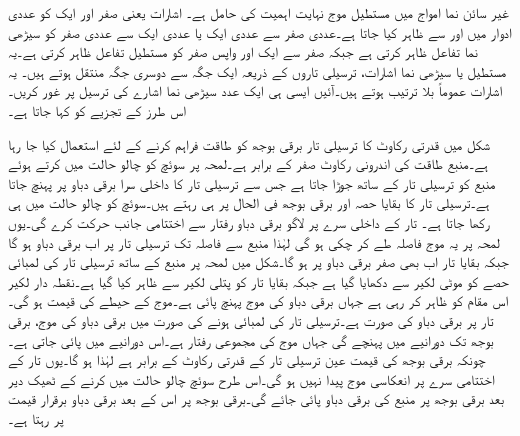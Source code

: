 غیر سائن نما امواج میں مستطیل موج نہایت اہمیت کی حامل ہے۔ اشارات یعنی صفر اور  ایک  کو عددی ادوار  میں  اور  سے ظاہر کیا جاتا ہے۔عددی صفر سے عددی ایک یا عددی ایک سے عددی صفر کو سیڑھی نما تفاعل ظاہر کرتی ہے جبکہ صفر سے ایک اور واپس صفر کو مستطیل تفاعل ظاہر کرتی ہے۔یہ مستطیل یا سیڑھی نما اشارات، ترسیلی تاروں کے ذریعہ ایک جگہ سے دوسری جگہ منتقل ہوتے ہیں۔ یہ اشارات عموماً بلا ترتیب ہوتے ہیں۔آئیں ایسی ہی ایک عدد سیڑھی نما اشارے کی ترسیل پر غور کریں۔ اس طرز کے تجزیے کو  کہا جاتا ہے۔

 شکل  میں  قدرتی رکاوٹ کا ترسیلی تار  برقی بوجھ کو طاقت فراہم کرنے کے لئے استعمال کیا جا رہا ہے۔منبع طاقت کی اندرونی رکاوٹ صفر کے برابر ہے۔لمحہ  پر سوئچ کو چالو حالت میں کرتے ہوئے منبع کو ترسیلی تار کے ساتھ جوڑا جاتا ہے جس سے ترسیلی تار کا داخلی سرا  برقی دباو پر پہنچ جاتا ہے۔ترسیلی تار کا بقایا حصہ اور برقی بوجھ فی الحال  پر ہی رہتے ہیں۔سوئچ کو چالو حالت میں ہی رکھا جاتا ہے۔ تار کے داخلی سرے پر لاگو برقی دباو رفتار  سے اختتامی جانب حرکت کرے گی۔یوں لمحہ  پر یہ موج  فاصلہ طے کر چکی ہو گی لہٰذا منبع سے فاصلہ  تک ترسیلی تار پر اب برقی دباو  ہو گا جبکہ بقایا تار اب بھی صفر برقی دباو پر ہو گا۔شکل  میں لمحہ  پر منبع کے ساتھ ترسیلی تار کی  لمبائی حصے کو موٹی لکیر سے دکھایا گیا ہے جبکہ بقایا تار کو پتلی لکیر سے ظاہر کیا گیا ہے۔نقطہ دار لکیر اس مقام کو ظاہر کر رہی ہے جہاں برقی دباو کی موج   پہنچ پائی ہے۔موج کے حیطے کی قیمت   ہو گی۔تار پر برقی دباو کی صورت  ہے۔ترسیلی تار کی لمبائی  ہونے کی صورت میں برقی دباو کی موج،  برقی بوجھ تک  دورانیے میں پہنچے گی جہاں  موج کی مجموعی رفتار ہے۔اس دورانیے میں  پائی جاتی ہے۔چونکہ برقی بوجھ کی قیمت عین ترسیلی تار کے قدرتی رکاوٹ کے  برابر ہے لہٰذا  ہو گا۔یوں تار کے اختتامی سرے پر انعکاسی موج پیدا نہیں ہو گی۔اس طرح سوئچ چالو حالت میں کرنے کے ٹھیک   دیر بعد برقی بوجھ پر منبع کی برقی دباو  پائی جائے گی۔برقی بوجھ پر اس کے بعد برقی دباو برقرار  قیمت پر رہتا ہے۔


